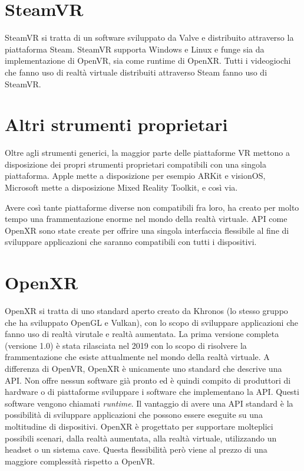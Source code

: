\documentclass[twoside]{supsistudent}
\begin{document}
\section{SteamVR}

SteamVR si tratta di un software sviluppato da Valve e distribuito attraverso la piattaforma Steam. SteamVR supporta Windows e Linux e funge sia da implementazione di OpenVR, sia come runtime di OpenXR. Tutti i videogiochi che fanno uso di realtà virtuale distribuiti attraverso Steam fanno uso di SteamVR.

\section{Altri strumenti proprietari}

Oltre agli strumenti generici, la maggior parte delle piattaforme VR mettono a disposizione dei propri strumenti proprietari compatibili con una singola piattaforma. Apple mette a disposizione per esempio ARKit e visionOS, Microsoft mette a disposizione Mixed Reality Toolkit, e così via.

Avere così tante piattaforme diverse non compatibili fra loro, ha creato per molto tempo una frammentazione enorme nel mondo della realtà virtuale. API come OpenXR sono state create per offrire una singola interfaccia flessibile al fine di sviluppare applicazioni che saranno compatibili con tutti i dispositivi.

\section{OpenXR}

OpenXR si tratta di uno standard aperto creato da Khronos (lo stesso gruppo che ha sviluppato OpenGL e Vulkan), con lo scopo di sviluppare applicazioni che fanno uso di realtà virutale e realtà aumentata. La prima versione completa (versione 1.0) è stata rilasciata nel 2019 con lo scopo di risolvere la frammentazione che esiste attualmente nel mondo della realtà virtuale. A differenza di OpenVR, OpenXR è unicamente uno standard che descrive una API. Non offre nessun software già pronto ed è quindi compito di produttori di hardware o di piattaforme sviluppare i software che implementano la API. Questi software vengono chiamati \textit{runtime}. Il vantaggio di avere una API standard è la possibilità di sviluppare applicazioni che possono essere eseguite su una moltitudine di dispositivi. OpenXR è progettato per supportare molteplici possibili scenari, dalla realtà aumentata, alla realtà virtuale, utilizzando un headset o un sistema cave. Questa flessibilità però viene al prezzo di una maggiore complessità rispetto a OpenVR.
\end{document}

